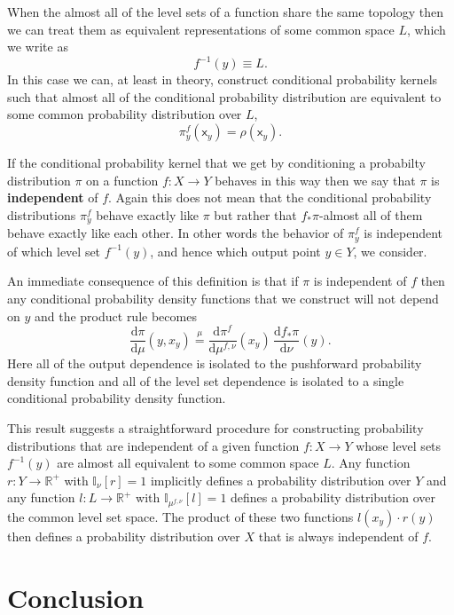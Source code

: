 \documentclass[
  letterpaper,
  DIV=11,
  numbers=noendperiod]{scrartcl}
\begin{document}
When the almost all of the level sets of a function share the same
topology then we can treat them as equivalent representations of some
common space \(L\), which we write as \[
f^{-1}(y) \equiv L.
\] In this case we can, at least in theory, construct conditional
probability kernels such that almost all of the conditional probability
distribution are equivalent to some common probability distribution over
\(L\), \[
\pi^{f}_{y} ( \mathsf{x}_{y} ) = \rho ( \mathsf{x}_{y} ).
\]

If the conditional probability kernel that we get by conditioning a
probabilty distribution \(\pi\) on a function \(f : X \rightarrow Y\)
behaves in this way then we say that \(\pi\) is \textbf{independent} of
\(f\). Again this does not mean that the conditional probability
distributions \(\pi^{f}_{y}\) behave exactly like \(\pi\) but rather
that \(f_{*} \pi\)-almost all of them behave exactly like each other. In
other words the behavior of \(\pi^{f}_{y}\) is independent of which
level set \(f^{-1}(y)\), and hence which output point \(y \in Y\), we
consider.

An immediate consequence of this definition is that if \(\pi\) is
independent of \(f\) then any conditional probability density functions
that we construct will not depend on \(y\) and the product rule becomes
\[
\frac{ \mathrm{d}  \pi }{ \mathrm{d}  \mu  } (y, x_{y})
\overset{\mu}{=}
\frac{ \mathrm{d}  \pi^{f} }{ \mathrm{d}  \mu^{f, \nu}  } (x_{y}) \,
\frac{ \mathrm{d}  f_{*} \pi }{ \mathrm{d}  \nu  } (y).
\] Here all of the output dependence is isolated to the pushforward
probability density function and all of the level set dependence is
isolated to a single conditional probability density function.

This result suggests a straightforward procedure for constructing
probability distributions that are independent of a given function
\(f : X \rightarrow Y\) whose level sets \(f^{-1}(y)\) are almost all
equivalent to some common space \(L\). Any function
\(r : Y \rightarrow \mathbb{R}^{+}\) with
\(\mathbb{I}_{\nu} \! \left[ r \right] = 1\) implicitly defines a
probability distribution over \(Y\) and any function
\(l : L \rightarrow \mathbb{R}^{+}\) with
\(\mathbb{I}_{\mu^{f, \nu}} \! \left[ l \right] = 1\) defines a
probability distribution over the common level set space. The product of
these two functions \(l(x_{y}) \cdot r(y)\) then defines a probability
distribution over \(X\) that is always independent of \(f\).

\section{Conclusion}\label{conclusion}
\end{document}
